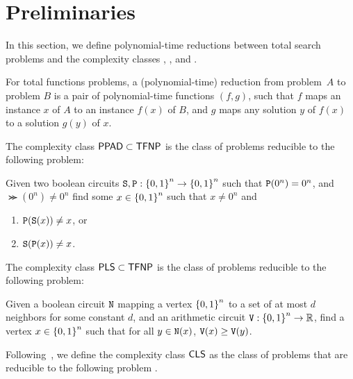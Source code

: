 \section{Preliminaries}

In this section, we define polynomial-time reductions between total search problems
and the complexity classes \PPAD, \PLS, and \CLS.
%
\begin{definition}
For total functions problems, a (polynomial-time) reduction from problem~$A$ to
problem $B$ is a pair of polynomial-time functions $(f,g)$, such that $f$ 
maps an instance $x$ of $A$ to an instance $f(x)$ of $B$, and $g$ maps
any solution $y$ of $f(x)$ to a solution $g(y)$ of $x$.
\end{definition}
%
The complexity class $\mathsf{PPAD} \subset \mathsf{TFNP}$ is the class of problems reducible to the following problem:
\begin{definition}
  Given two boolean circuits $\operatorname{\texttt{S}}, \operatorname{\texttt{P}}: \left\{ 0,1 \right\}^n\to \left\{ 0,1 \right\}^n$ such that $\operatorname{\texttt{P}}(0^n) = 0^n$, and $\Succ(0^n) \neq 0^n$ find some $x\in \left\{ 0,1 \right\}^n$ such that $x \neq 0^n$ and 
  \begin{enumerate}[leftmargin=*,label=(P\arabic*)]
    \item $\operatorname{\texttt{P}}(\operatorname{\texttt{S}}(x)) \neq x$, or
    \item $\operatorname{\texttt{S}}(\operatorname{\texttt{P}}(x)) \neq x$.
  \end{enumerate}
\end{definition}

The complexity class $\mathsf{PLS} \subset \mathsf{TFNP}$ is the class of problems reducible to the following problem:
\begin{definition}
  Given a boolean circuit $\operatorname{\texttt{N}}$ mapping a vertex $\left\{ 0,1 \right\}^n$ to a set of at most $d$ neighbors for some constant $d$, and an arithmetic circuit $\Value : \Set{0,1}^n \to \R$, find a vertex $x\in \left\{ 0,1 \right\}^n$ such that for all $y\in \operatorname{\texttt{N}}(x)$, $\operatorname{\texttt{V}}(x) \geq \operatorname{\texttt{V}}(y)$.
\end{definition}


Following~\cite{daskalakis2011continuous}, we define the complexity class $\mathsf{CLS}$
as the class of problems that are reducible to the following problem \CLO.

